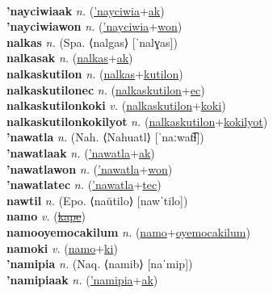  \label{'nayciwia} \\
\textbf{'nayciwiaak} \textit{n.} (\hyperref['nayciwia]{'nayciwia}+\hyperref[ak]{ak})
 \label{'nayciwiaak} \\
\textbf{'nayciwiawon} \textit{n.} (\hyperref['nayciwia]{'nayciwia}+\hyperref[won]{won})
 \label{'nayciwiawon} \\
\textbf{nalkas} \textit{n.} (Spa. ⟨nalgas⟩ [ˈnalɣas])
 \label{nalkas} \\
\textbf{nalkasak} \textit{n.} (\hyperref[nalkas]{nalkas}+\hyperref[ak]{ak})
 \label{nalkasak} \\
\textbf{nalkaskutilon} \textit{n.} (\hyperref[nalkas]{nalkas}+\hyperref[kutilon]{kutilon})
 \label{nalkaskutilon} \\
\textbf{nalkaskutilonec} \textit{n.} (\hyperref[nalkaskutilon]{nalkaskutilon}+\hyperref[ec]{ec})
 \label{nalkaskutilonec} \\
\textbf{nalkaskutilonkoki} \textit{v.} (\hyperref[nalkaskutilon]{nalkaskutilon}+\hyperref[koki]{koki})
 \label{nalkaskutilonkoki} \\
\textbf{nalkaskutilonkokilyot} \textit{n.} (\hyperref[nalkaskutilon]{nalkaskutilon}+\hyperref[kokilyot]{kokilyot})
 \label{nalkaskutilonkokilyot} \\
\textbf{'nawatla} \textit{n.} (Nah. ⟨Nahuatl⟩ [ˈnaːwat͡ɬ])
 \label{'nawatla} \\
\textbf{'nawatlaak} \textit{n.} (\hyperref['nawatla]{'nawatla}+\hyperref[ak]{ak})
 \label{'nawatlaak} \\
\textbf{'nawatlawon} \textit{n.} (\hyperref['nawatla]{'nawatla}+\hyperref[won]{won})
 \label{'nawatlawon} \\
\textbf{'nawatlatec} \textit{n.} (\hyperref['nawatla]{'nawatla}+\hyperref[tec]{tec})
 \label{'nawatlatec} \\
\textbf{nawtil} \textit{n.} (Epo. ⟨naŭtilo⟩ [nawˈtilo])
 \label{nawtil} \\
\textbf{namo} \textit{v.} (\hyperref[kape]{\sout{kape}})
 \label{namo} \\
\textbf{namooyemocakilum} \textit{n.} (\hyperref[namo]{namo}+\hyperref[oyemocakilum]{oyemocakilum})
 \label{namooyemocakilum} \\
\textbf{namoki} \textit{v.} (\hyperref[namo]{namo}+\hyperref[ki]{ki})
 \label{namoki} \\
\textbf{'namipia} \textit{n.} (Naq. ⟨namib⟩ [naˈmip])
 \label{'namipia} \\
\textbf{'namipiaak} \textit{n.} (\hyperref['namipia]{'namipia}+\hyperref[ak]{ak})
 \label{'namipiaak} \\
